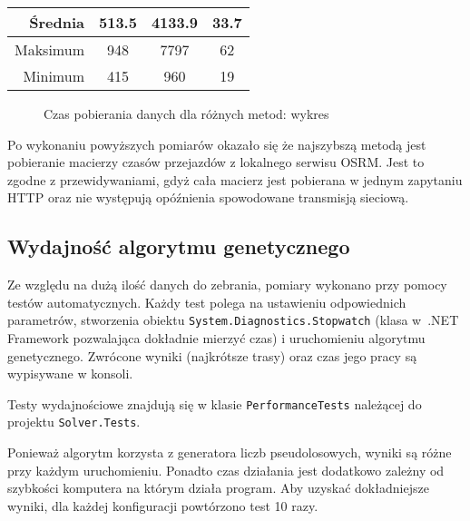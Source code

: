 \begin{table}[H]
\begin{tabular}{r|ccc}
\textbf{Średnia} & \textbf{513.5}       & \textbf{4133.9}                                                    & \textbf{33.7}                                                      \\ \hline
Maksimum         & 948                  & 7797                                                               & 62                                                                 \\ \hline
Minimum          & 415                  & 960                                                                & 19                                                                

	\end{tabular}
\end{table}
\begin{figure}[H]
	\caption{Czas pobierania danych dla różnych metod: wykres}
	\begin{bchart}[max=5000, step=1000, unit=ms]
		\label{chart:pobieranie}
		\smallskip
		\smallskip
	\end{bchart}
\end{figure}

Po wykonaniu powyższych pomiarów okazało się że najszybszą metodą jest pobieranie macierzy czasów przejazdów z lokalnego serwisu OSRM. Jest to zgodne z przewidywaniami, gdyż cała macierz jest pobierana w jednym zapytaniu HTTP oraz nie występują opóźnienia spowodowane transmisją sieciową.

\clearpage

\subsection*{Wydajność algorytmu genetycznego}
Ze względu na dużą ilość danych do zebrania, pomiary wykonano przy pomocy testów automatycznych. Każdy test polega na ustawieniu odpowiednich parametrów, stworzenia obiektu \texttt{System.Diagnostics.Stopwatch} (klasa w~.NET Framework pozwalająca dokładnie mierzyć czas) i uruchomieniu algorytmu genetycznego. Zwrócone wyniki (najkrótsze trasy) oraz czas jego pracy są wypisywane w konsoli.

Testy wydajnościowe znajdują się w klasie \texttt{PerformanceTests} należącej do projektu \texttt{Solver.Tests}.

Ponieważ algorytm korzysta z generatora liczb pseudolosowych, wyniki są różne przy każdym uruchomieniu. Ponadto czas działania jest dodatkowo zależny od szybkości komputera na którym działa program. Aby uzyskać dokładniejsze wyniki, dla każdej konfiguracji powtórzono test 10 razy. 

